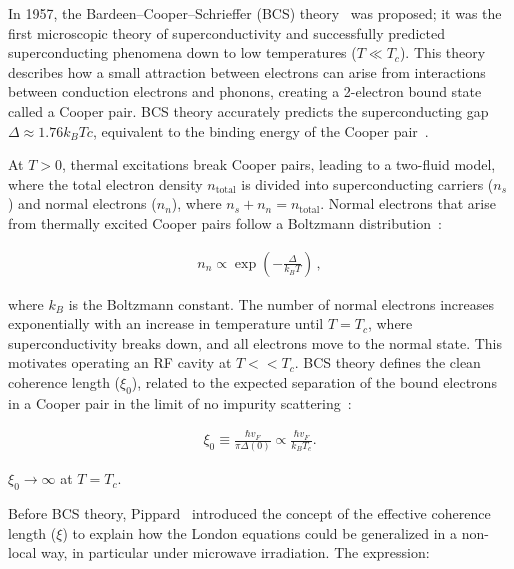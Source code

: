     In 1957, the Bardeen–Cooper–Schrieffer (BCS) theory~\cite{Bardeen:1957mv} was proposed; it was the first microscopic theory of superconductivity and successfully predicted superconducting phenomena down to low temperatures ($T \ll T_c$). This theory describes how a small attraction between electrons can arise from interactions between conduction electrons and phonons, creating a 2-electron bound state called a Cooper pair. BCS theory accurately predicts the superconducting gap $\Delta \approx 1.76 k_B Tc$, equivalent to the binding energy of the Cooper pair~\cite{bardeenTheoryMeissnerEffect1955}. 
    
    At $T > 0$, thermal excitations break Cooper pairs, leading to a two-fluid model, where the total electron density $n_{\text{total}}$ is divided into superconducting carriers ($n_s$) and normal electrons ($n_n$), where $n_s + n_n = n_{\text{total}}$. Normal electrons that arise from thermally excited Cooper pairs follow a Boltzmann distribution~\cite{landauTheorySuperfluidity1949, tinkhamIntroductionSuperconductivity2004}:

    \begin{align}
        n_{n} \propto \exp \left( -\frac{\Delta}{k_B T}   \right )\,, \label{eq:normalelectrons}
    \end{align}


    \noindent where $k_B$ is the Boltzmann constant. The number of normal electrons increases exponentially with an increase in temperature until $T=T_c$, where superconductivity breaks down, and all electrons move to the normal state. This motivates operating an RF cavity at $T<<T_c$. BCS theory defines the clean coherence length ($\xi_0$), related to the expected separation of the bound electrons in a Cooper pair in the limit of no impurity scattering~\cite{tinkhamIntroductionSuperconductivity2004}:


    \begin{align}
        \xi_0 \equiv \frac{\hbar v_F}{\pi \Delta(0)} \propto \frac{\hbar v_F}{k_B T_c}  .\label{eq:coherencelengthpure}
    \end{align}

    \noindent $\xi_0 \rightarrow\infty$ at $T = T_c$. 

    Before BCS theory, Pippard~\cite{pippardCoherenceConceptSuperconductivity1953} introduced the concept of the effective coherence length ($\xi$) to explain how the London equations could be generalized in a non-local way, in particular under microwave irradiation. The expression:
    
